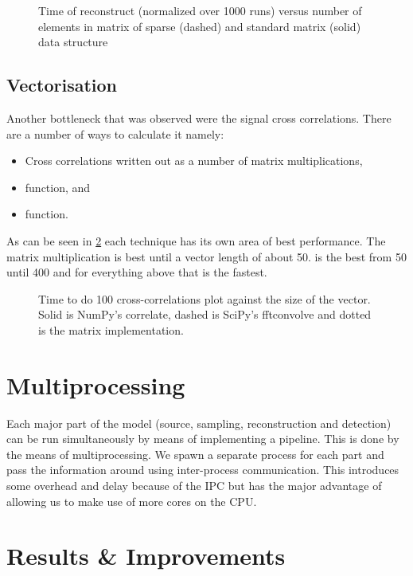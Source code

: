 \documentclass[a4paper, openany, oneside]{memoir}
\begin{document}
\begin{figure}[]
    \centering
    
    \caption{Time of reconstruct (normalized over 1000 runs) versus number of elements in matrix of sparse (dashed) and standard matrix (solid) data structure}
    \label{fig:sparse}
\end{figure}

\subsection{Vectorisation}
\label{sec:vectorisation}
Another bottleneck that was observed were the signal cross correlations. There are a number of ways to calculate it namely:
\begin{itemize}
    \item Cross correlations written out as a number of matrix multiplications,
    \item {}  function, and
    \item {}  function.
\end{itemize}
As can be seen in \cref{fig:sparse} each technique has its own area of best performance. The matrix multiplication is best until a vector length of about 50.   is the best from 50 until 400 and for everything above that  is the fastest.

\begin{figure}[]
    \centering
    
    \caption{Time to do 100 cross-correlations plot against the size of the vector. Solid is NumPy's correlate, dashed is SciPy's fftconvolve and dotted is the matrix implementation.}
    \label{fig:sparse}
\end{figure}

\section{Multiprocessing}
\label{sec:multiprocessing}

Each major part of the model (source, sampling, reconstruction and detection) can be run simultaneously by means of implementing a pipeline. This is done by the means of multiprocessing. We spawn a separate process for each part and pass the information around using inter-process communication. This introduces some overhead and delay because of the IPC but has the major advantage of allowing us to make use of more cores on the CPU.

\section{Results \& Improvements}
\label{sec:results}
\end{document}
